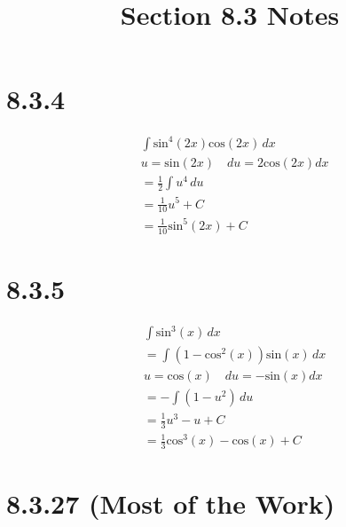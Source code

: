 \documentclass[11pt]{article}
\title{Section 8.3 Notes}
\begin{document}
\maketitle

\section*{8.3.4}

\begin{align*}
&\int \text{sin}^4(2x)\text{cos}(2x) \, dx\\
&u = \text{sin}(2x) \quad du = 2\text{cos}(2x) dx\\
&=\frac{1}{2}\int u^4 \, du\\
&=\frac{1}{10}u^5 + C\\
&=\frac{1}{10}\text{sin}^5(2x) + C
\end{align*}

\section*{8.3.5}

\begin{align*}
&\int \text{sin}^3(x) \, dx\\
&=\int (1-\text{cos}^2(x))\text{sin}(x) \, dx\\
&u = \text{cos}(x) \quad du = -\text{sin}(x) dx\\
&=-\int (1-u^2)\, du\\
&= \frac{1}{3}u^3 - u + C\\
&=\frac{1}{3}\text{cos}^3(x)-\text{cos}(x) + C
\end{align*}

\section*{8.3.27 (Most of the Work)}
\end{document}
